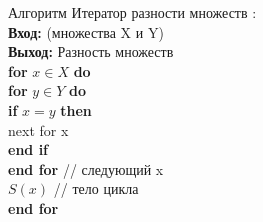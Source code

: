\documentclass[a4paper,14pt]{article}
\newcommand\tab[1][0.5cm]{\hspace*{#1}}
\numberwithin{equation}{section}
\begin{document}
\noindent
Алгоритм Итератор разности множеств $:$ \\
\textbf{Вход:}  (множества X и Y) \\
\textbf{Выход:} Разность множеств \\
\tab \textbf{for}  $x \in X$ \textbf{do} \\
\tab \tab \textbf{for}  $y \in Y$ \textbf{do} \\
\tab \tab \tab \textbf{if}  $x = y$ \textbf{then} \\
\tab \tab \tab \tab next for x\\
\tab \tab \tab \textbf{end if}\\
\tab \tab \textbf{end for} {\color{gray}// следующий x}\\
\tab \tab  $S(x)$ {\color{gray}// тело цикла}\\
\tab \textbf{end for}\\
\end{document}
